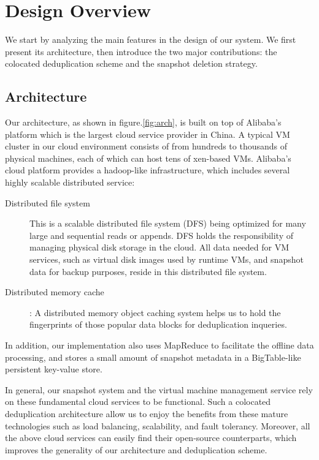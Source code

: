 \section{Design Overview}
We start by analyzing the main features in the design of our system.
We first present its architecture,
then introduce the two major contributions: the colocated deduplication 
scheme and the snapshot deletion strategy.
\subsection{Architecture}
Our architecture, as shown in figure.\ref{fig:arch}, is built on top of 
Alibaba's platform which is the largest cloud service provider in China. 
A typical VM cluster in our cloud environment
consists of from hundreds to thousands of physical machines, each of which can
host tens of xen-based\cite{Barham2003} VMs.
Alibaba's cloud platform provides a hadoop-like infrastructure, 
which includes several highly scalable distributed service:
\begin{description}
\item[Distributed file system] This is a scalable distributed file system (DFS) being optimized for many large and sequential reads or appends. DFS holds the responsibility of managing physical disk storage
in the cloud. All data needed for VM services, such as virtual disk images used by runtime VMs,
and snapshot data for backup purposes, reside in this distributed file system. 
\item[Distributed memory cache]: A distributed memory object caching system helps us to hold the fingerprints of those popular data blocks for deduplication inqueries. 
\end{description}
In addition, our implementation also uses MapReduce to facilitate the offline
data processing, and stores a small amount of snapshot metadata in a 
BigTable-like persistent key-value store. 

In general, our snapshot system and the virtual machine management service 
rely on these fundamental cloud services
to be functional. Such a colocated deduplication architecture allow us 
to enjoy the benefits from these mature technologies 
such as load balancing, scalability, and fault tolerancy.
Moreover, all the above cloud services can easily find their open-source counterparts,
which improves the generality of our architecture and deduplication scheme.

